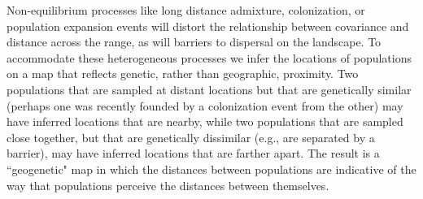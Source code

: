 \documentclass[12pt]{article}
\begin{document}
Non-equilibrium processes like long distance admixture, colonization, or population expansion events will distort the relationship between covariance and distance across the range, as will barriers to dispersal on the landscape. To accommodate these heterogeneous processes we infer the locations of populations on a map that reflects genetic, rather than geographic, proximity. Two populations that are sampled at distant locations but that are genetically similar (perhaps one was recently founded by a colonization event from the other) may have inferred locations that are nearby, while two populations that are sampled close together, but that are genetically dissimilar (e.g., are separated by a barrier), may have inferred locations that are farther apart. The result is a ``geogenetic" map in which the distances between populations are indicative of the way that populations perceive the distances between themselves.
\end{document}
